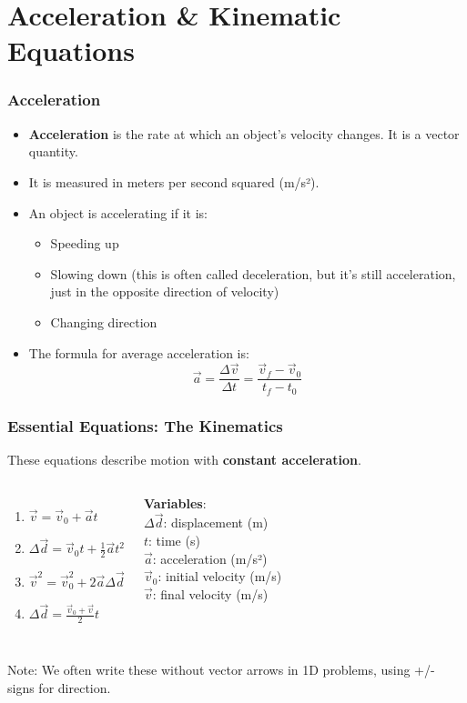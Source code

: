 \documentclass{beamer}
\begin{document}
\section{Acceleration \& Kinematic Equations}

\begin{frame}
\frametitle{Acceleration}
\begin{itemize}
    \item \textbf{Acceleration} is the rate at which an object's velocity changes. It is a \alert{vector} quantity.
    \pause
    \item It is measured in meters per second squared (m/s²).
    \pause
    \item An object is accelerating if it is:
    \pause
    \begin{itemize}
        \item Speeding up
        \pause
        \item Slowing down (this is often called deceleration, but it's still acceleration, just in the opposite direction of velocity)
        \pause
        \item Changing direction
    \end{itemize}
    \pause
    \item The formula for average acceleration is:
    \[ \vec{a} = \frac{\Delta \vec{v}}{\Delta t} = \frac{\vec{v}_f - \vec{v}_0}{t_f - t_0} \]
\end{itemize}
\end{frame}

\begin{frame}
\frametitle{Essential Equations: The Kinematics}
These equations describe motion with \textbf{constant acceleration}.
\pause
\begin{columns}
\begin{enumerate}
    \item $\vec{v} = \vec{v}_0 + \vec{a}t$
    \pause
    \item $\Delta\vec{d} = \vec{v}_0 t + \frac{1}{2}\vec{a}t^2$
    \pause
    \item $\vec{v}^2 = \vec{v}_0^2 + 2\vec{a}\Delta\vec{d}$
    \pause
    \item $\Delta\vec{d} = \frac{\vec{v}_0 + \vec{v}}{2} t$
\end{enumerate}
\pause
\textbf{Variables}:\\
$\Delta\vec{d}$: displacement (m)\\
$t$: time (s)\\
$\vec{a}$: acceleration (m/s²)\\
$\vec{v}_0$: initial velocity (m/s)\\
$\vec{v}$: final velocity (m/s)
\end{columns}
\vspace{1em}
\pause
\alert{Note:} We often write these without vector arrows in 1D problems, using +/- signs for direction.
\end{frame}
\end{document}
